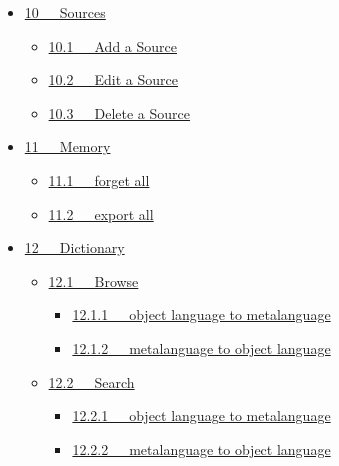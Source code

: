 \documentclass[letterpaper,10pt,english]{sphinxmanual}
\begin{document}
{\begin{minipage}{0.95\linewidth}
\begin{itemize}
\begin{itemize}
\end{itemize}

\item {} 
{\hyperref[documentation:sources]{10   Sources}}
\begin{itemize}
\item {} 
{\hyperref[documentation:add-a-source]{10.1   Add a Source}}

\item {} 
{\hyperref[documentation:edit-a-source]{10.2   Edit a Source}}

\item {} 
{\hyperref[documentation:delete-a-source]{10.3   Delete a Source}}

\end{itemize}

\item {} 
{\hyperref[documentation:memory]{11   Memory}}
\begin{itemize}
\item {} 
{\hyperref[documentation:forget-all]{11.1   forget all}}

\item {} 
{\hyperref[documentation:id22]{11.2   export all}}

\end{itemize}

\item {} 
{\hyperref[documentation:dictionary]{12   Dictionary}}
\begin{itemize}
\item {} 
{\hyperref[documentation:browse]{12.1   Browse}}
\begin{itemize}
\item {} 
{\hyperref[documentation:object-language-to-metalanguage]{12.1.1   object language to metalanguage}}

\item {} 
{\hyperref[documentation:metalanguage-to-object-language]{12.1.2   metalanguage to object language}}

\end{itemize}

\item {} 
{\hyperref[documentation:search]{12.2   Search}}
\begin{itemize}
\item {} 
{\hyperref[documentation:id23]{12.2.1   object language to metalanguage}}

\item {} 
{\hyperref[documentation:id24]{12.2.2   metalanguage to object language}}


\end{itemize}
\end{itemize}
\end{itemize}
\end{minipage}}
\end{document}
